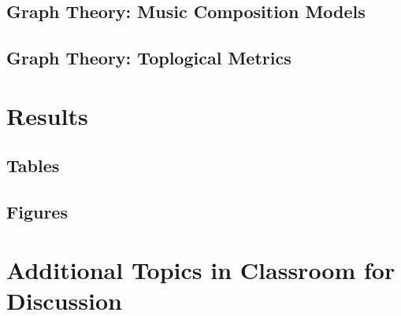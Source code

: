 \subsection{Graph Theory: Music Composition Models}

\subsection{Graph Theory: Toplogical Metrics}

\section{Results}

\subsection{Tables}


\subsection{Figures}


\section{Additional Topics in Classroom for Discussion}

\begin{enumerate}
\end{enumerate}



\begin{thebibliography}{00}

\end{thebibliography}


